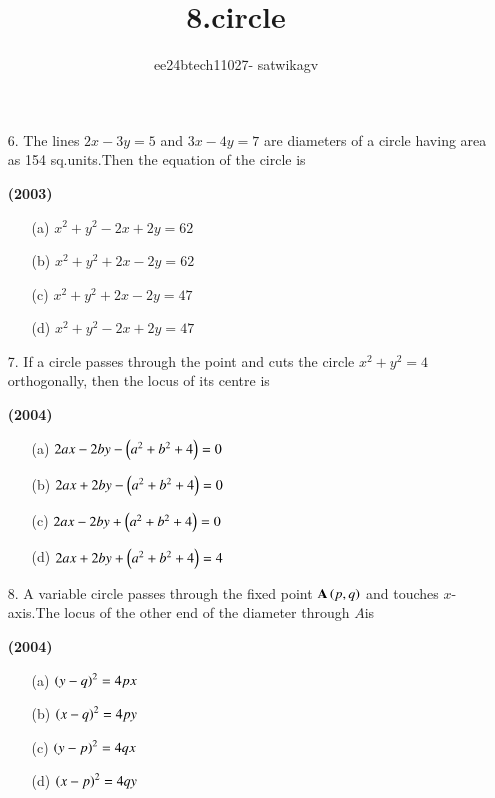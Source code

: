 \documentclass[journal,12pt,twocolumn]{IEEEtran}
\theoremstyle{remark}
\begin{document}

\vspace{3cm}

\title{8.circle}
\author{ee24btech11027- satwikagv}
\maketitle
\newpage
\bigskip

\renewcommand{\thefigure}{\theenumi}
\renewcommand{\thetable}{\theenumi}
\begin{enumerate}
\item[6.]The lines $2x-3y=5$ and $3x-4y=7$ are diameters of a circle having area as 154 sq.units.Then the equation of the circle is

\hfill{\textbf{(2003)}}

\begin{enumerate}
\item[(a)] $x^2+y^2-2x+2y=62$
\item[(b)] $x^2+y^2+2x-2y=62$
\item[(c)] $x^2+y^2+2x-2y=47$
\item[(d)] $x^2+y^2-2x+2y=47$
\end{enumerate}
\end{enumerate}
\begin{enumerate}
\item[7.]If a circle passes through the point  and cuts the circle $x^2+y^2=4$ orthogonally, then the locus of its centre is

\hfill{\textbf{(2004)}}

\begin{enumerate}
\item[(a)] $2ax-2by-\left(a^2+b^2+4\right)=0$
\item[(b)] $2ax+2by-\left(a^2+b^2+4\right)=0$
\item[(c)] $2ax-2by+\left(a^2+b^2+4\right)=0$
\item[(d)] $2ax+2by+\left(a^2+b^2+4\right)=4$
\end{enumerate}
\end{enumerate}
\begin{enumerate}
\item[8.]A variable circle passes through the fixed point $\mathbf{A}\left(p,q\right)$ and touches $x$-axis.The locus of the other end of the diameter through $A$is

\hfill{\textbf{(2004)}}

\begin{enumerate}
\item[(a)] $\left(y-q\right)^2=4px$
\item[(b)] $\left(x-q\right)^2=4py$ 
\item[(c)] $\left(y-p\right)^2=4qx$
\item[(d)] $\left(x-p\right)^2=4qy$
\end{enumerate}
\end{enumerate}
\end{document}
